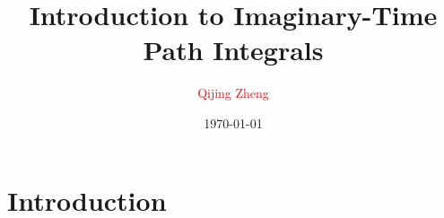 \documentclass[8pt,dvipsnames]{beamer}
\title[]{
  Introduction to Imaginary-Time Path Integrals
}
\author[Q.J. Zheng]{
  \textcolor{red}{Qijing Zheng} \\
}
\institute[D.P. USTC]{
  Department of Physics \\
  \medskip
  University of Science and Technology of China \\
  \smallskip
  \texttt{[image: logo.jpg]}
}
\date{\today}
\begin{document}

% 

\section{Introduction}








 
 
 


\end{document}

